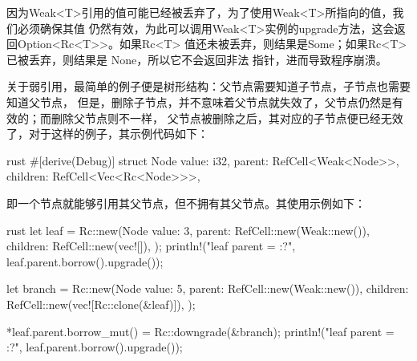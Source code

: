 因为Weak<T>引用的值可能已经被丢弃了，为了使用Weak<T>所指向的值，我们必须确保其值
仍然有效，为此可以调用Weak<T>实例的upgrade方法，这会返回Option<Rc<T>>。如果Rc<T>
值还未被丢弃，则结果是Some；如果Rc<T>已被丢弃，则结果是 None，所以它不会返回非法
指针，进而导致程序崩溃。

关于弱引用，最简单的例子便是树形结构：父节点需要知道子节点，子节点也需要知道父节点，
但是，删除子节点，并不意味着父节点就失效了，父节点仍然是有效的；而删除父节点则不一样，
父节点被删除之后，其对应的子节点便已经无效了，对于这样的例子，其示例代码如下：
\begin{code-block}{rust}
#[derive(Debug)]
struct Node {
    value: i32,
    parent: RefCell<Weak<Node>>,
    children: RefCell<Vec<Rc<Node>>>,
}
\end{code-block}
即一个节点就能够引用其父节点，但不拥有其父节点。其使用示例如下：
\begin{code-block}{rust}
let leaf = Rc::new(Node {
    value: 3,
    parent: RefCell::new(Weak::new()),
    children: RefCell::new(vec![]),
});
println!("leaf parent = {:?}", leaf.parent.borrow().upgrade());

let branch = Rc::new(Node {
    value: 5,
    parent: RefCell::new(Weak::new()),
    children: RefCell::new(vec![Rc::clone(&leaf)]),
});

*leaf.parent.borrow_mut() = Rc::downgrade(&branch);
println!("leaf parent = {:?}", leaf.parent.borrow().upgrade());
\end{code-block}

